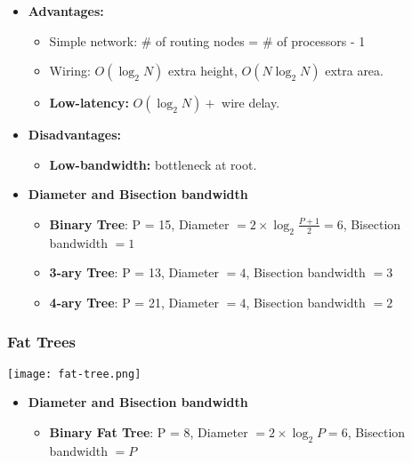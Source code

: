 \documentclass[../main.tex]{subfiles}
\begin{document}
\begin{multicols}{2}

	\begin{itemize}
		\item \textbf{Advantages:}
		      \begin{itemize}
			      \item Simple network: \# of routing nodes = \# of processors - 1
			      \item Wiring: \(O(\log_2{N})\) extra height, \(O(N\log_2{N})\) extra area.
			      \item \textbf{Low-latency:} \(O(\log_2{N}) +\) wire delay.
		      \end{itemize}
		\item \textbf{Disadvantages:}
		      \begin{itemize}
			      \item \textbf{Low-bandwidth:} bottleneck at root.
		      \end{itemize}
	\end{itemize}

	\begin{itemize}

		\item \textbf{Diameter and Bisection bandwidth}
		      \begin{itemize}
			      \item \textbf{Binary Tree}: P = 15, Diameter \(= 2\times \log_2{\frac{P+1}{2}} = 6\), Bisection bandwidth \(= 1\)
			      \item \textbf{3-ary Tree}: P = 13, Diameter \(= 4\), Bisection bandwidth \(= 3\)
			      \item \textbf{4-ary Tree}: P = 21, Diameter \(= 4\), Bisection bandwidth \(= 2\)
		      \end{itemize}

	\end{itemize}

\end{multicols}

\subsubsection{Fat Trees}


\begin{center}
	\texttt{[image: fat-tree.png]}
\end{center}

\begin{itemize}
	\item \textbf{Diameter and Bisection bandwidth}
	      \begin{itemize}
		      \item \textbf{Binary Fat Tree}: P = 8, Diameter \(= 2\times \log_2{P} = 6\), Bisection bandwidth \(= P\)
	      \end{itemize}
\end{itemize}

\end{document}
